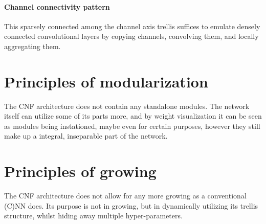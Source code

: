 \documentclass[a4paper,twocolumn]{article}
\begin{document}
\paragraph{Channel connectivity pattern}
This sparsely connected among the channel axis trellis suffices to emulate densely connected convolutional layers by copying channels, convolving them, and locally aggregating them.


\section{Principles of modularization}
The CNF architecture does not contain any standalone modules. The network itself can utilize some of its parts more, and by weight visualization it can be seen as modules being instationed, maybe even for certain purposes, however they still make up a integral, inseparable part of the network.

\section{Principles of growing}
The CNF architecture does not allow for any more growing as a conventional (C)NN does. Its purpose is not in growing, but in dynamically utilizing its trellis structure, whilst hiding away multiple hyper-parameters.
\end{document}
